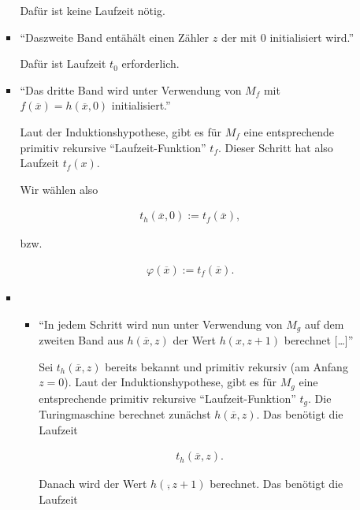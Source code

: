\begin{solution}
\begin{enumerate}[wide, labelindent = 0pt]
\begin{itemize}
\begin{itemize}
            Dafür ist keine Laufzeit nötig.

            \item \enquote{Daszweite Band entähält einen Zähler $z$ der mit $0$ initialisiert wird.}
            
            Dafür ist Laufzeit $t_0$ erforderlich.

            \item \enquote{Das dritte Band wird unter Verwendung von $M_f$ mit $f(\overline x) = h(\overline x, 0)$ initialisiert.}

            Laut der Induktionshypothese, gibt es für $M_f$ eine entsprechende primitiv rekursive \enquote{Laufzeit-Funktion} $t_f$.
            Dieser Schritt hat also Laufzeit $t_f(x)$.

            Wir wählen also

            \begin{align*}
                t_h(\overline x, 0)
                :=
                t_f(\overline x),
            \end{align*}

            bzw.

            \begin{align*}
                \varphi(\overline x)
                :=
                t_f(\overline x).
            \end{align*}

            \item

            \begin{itemize}

                \item \enquote{In jedem Schritt wird nun unter Verwendung von $M_g$ auf dem zweiten Band aus $h(\overline x, z)$ der Wert $h(x, z + 1)$ berechnet [\dots]}

                Sei $ t_h(\overline x, z)$ bereits bekannt und primitiv rekursiv (am Anfang $z = 0$).
                Laut der Induktionshypothese, gibt es für $M_g$ eine entsprechende primitiv rekursive \enquote{Laufzeit-Funktion} $t_g$.
                Die Turingmaschine berechnet zunächst $h(\overline x, z)$.
                Das benötigt die Laufzeit
    
                \begin{align*}
                    t_h(\overline x, z).
                \end{align*}
    
                Danach wird der Wert $h(\overline, z + 1)$ berechnet.
                Das benötigt die Laufzeit


\end{itemize}
\end{itemize}
\end{itemize}
\end{enumerate}
\end{solution}
